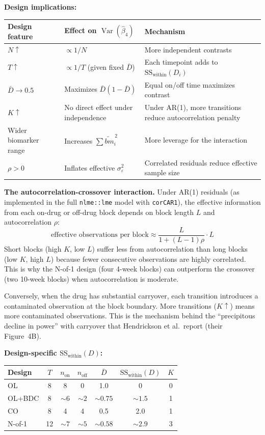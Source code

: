 \documentclass[11pt,letterpaper]{article}
\begin{document}
\textbf{Design implications:}

\begin{table}[h]
\centering\small
\begin{tabular}{@{}L{3.5cm}L{4.5cm}L{5.5cm}@{}}
\toprule
Design feature & Effect on $\operatorname{Var}(\hat{\beta}_4)$ & Mechanism \\
\midrule
$N \uparrow$ & $\propto 1/N$ & More independent contrasts \\
$T \uparrow$ & $\propto 1/T$ (given fixed $\bar{D}$) & Each timepoint adds to $\text{SS}_{\text{within}}(D_i)$ \\
$\bar{D} \to 0.5$ & Maximizes $\bar{D}(1-\bar{D})$ & Equal on/off time maximizes contrast \\
$K \uparrow$ & No direct effect under independence & Under AR(1), more transitions reduce autocorrelation penalty \\
Wider biomarker range & Increases $\sum \widetilde{bm}_i^{\,2}$ & More leverage for the interaction \\
$\rho > 0$ & Inflates effective $\sigma^2_\varepsilon$ & Correlated residuals reduce effective sample size \\
\bottomrule
\end{tabular}
\end{table}

\textbf{The autocorrelation-crossover interaction.} Under AR(1)
residuals (as implemented in the full \texttt{nlme::lme} model with
\texttt{corCAR1}), the effective information from each on-drug or
off-drug block depends on block length $L$ and autocorrelation $\rho$:
\[
\text{effective observations per block} \approx
\frac{L}{1 + (L-1)\rho} \cdot L
\]
Short blocks (high $K$, low $L$) suffer less from autocorrelation than
long blocks (low $K$, high $L$) because fewer consecutive observations
are highly correlated. This is why the N-of-1 design (four 4-week
blocks) can outperform the crossover (two 10-week blocks) when
autocorrelation is moderate.

Conversely, when the drug has substantial carryover, each transition
introduces a contaminated observation at the block boundary. More
transitions ($K \uparrow$) means more contaminated observations. This
is the mechanism behind the ``precipitous decline in power'' with
carryover that Hendrickson et al.\ report (their Figure~4B).

\textbf{Design-specific $\text{SS}_{\text{within}}(D)$:}

\begin{table}[h]
\centering
\begin{tabular}{@{}lcccccc@{}}
\toprule
Design & $T$ & $n_{\text{on}}$ & $n_{\text{off}}$ & $\bar{D}$ &
$\text{SS}_{\text{within}}(D)$ & $K$ \\
\midrule
OL & 8 & 8 & 0 & 1.0 & 0 & 0 \\
OL+BDC & 8 & ${\sim}6$ & ${\sim}2$ & ${\sim}0.75$ & ${\sim}1.5$ & 1 \\
CO & 8 & 4 & 4 & 0.5 & 2.0 & 1 \\
N-of-1 & 12 & ${\sim}7$ & ${\sim}5$ & ${\sim}0.58$ & ${\sim}2.9$ & 3 \\
\bottomrule
\end{tabular}
\end{table}
\end{document}
